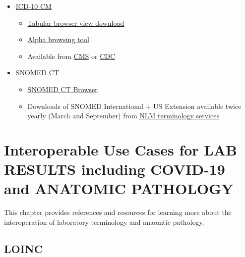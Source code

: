\documentclass[
]{journal}
\providecommand{\tightlist}{%
  \setlength{\itemsep}{0pt}\setlength{\parskip}{0pt}}
\begin{document}
\begin{itemize}
\tightlist
\item
  \href{https://www.cms.gov/medicare/icd-10/2022-icd-10-cm}{ICD-10 CM}

  \begin{itemize}
  \tightlist
  \item
    \href{https://ftp.cdc.gov/pub/health_statistics/nchs/publications/ICD10CM/2022/icd10cm_tabular_2022.pdf}{Tabular browser view download}
  \item
    \href{https://icd10cmtool.cdc.gov/}{Alpha browsing tool}
  \item
    Available from \href{https://www.cms.gov/medicare/icd-10/2022-icd-10-cm}{CMS} or \href{https://ftp.cdc.gov/pub/Health_Statistics/NCHS/Publications/ICD10CM/2022/}{CDC}
  \end{itemize}
\item
  \href{https://www.snomed.org/}{SNOMED CT}

  \begin{itemize}
  \tightlist
  \item
    \href{https://browser.ihtsdotools.org/}{SNOMED CT Browser}
  \item
    Downloads of SNOMED International + US Extension available twice yearly (March and September) from \href{https://uts.nlm.nih.gov/uts/}{NLM terminology services}
  \end{itemize}
\end{itemize}

\hypertarget{interoperable-use-cases-for-lab-results-including-covid-19-and-anatomic-pathology}{%
\section{Interoperable Use Cases for LAB RESULTS including COVID-19 and ANATOMIC PATHOLOGY}\label{interoperable-use-cases-for-lab-results-including-covid-19-and-anatomic-pathology}}

This chapter provides references and resources for learning more about the interoperation of laboratory terminology and anaomtic pathology.

\hypertarget{loinc}{%
\subsection{LOINC}\label{loinc}}
\end{document}
